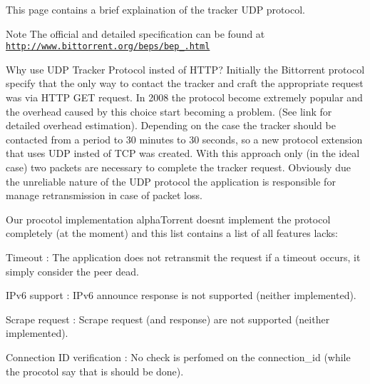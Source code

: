 This page contains a brief explaination of the tracker U\+DP protocol.

\begin{DoxyNote}{Note}
The official and detailed specification can be found at \href{http://www.bittorrent.org/beps/bep_0015.html}{\tt http\+://www.\+bittorrent.\+org/beps/bep\+\_.\+html}
\end{DoxyNote}
\begin{DoxyParagraph}{Why use U\+DP Tracker Protocol insted of H\+T\+TP?}
Initially the Bittorrent protocol specify that the only way to contact the tracker and craft the appropriate request was via H\+T\+TP G\+ET request. In 2008 the protocol become extremely popular and the overhead caused by this choice start becoming a problem. (See link for detailed overhead estimation). Depending on the case the tracker should be contacted from a period to 30 minutes to 30 seconds, so a new protocol extension that uses U\+DP insted of T\+CP was created. With this approach only (in the ideal case) two packets are necessary to complete the tracker request. Obviously due the unreliable nature of the U\+DP protocol the application is responsible for manage retransmission in case of packet loss.
\end{DoxyParagraph}
\begin{DoxyParagraph}{Our procotol implementation}
alpha\+Torrent doesn\textquotesingle{}t implement the protocol completely (at the moment) and this list contains a list of all features lacks\+:
\begin{DoxyEnumerate}
\item Timeout \+: The application does not retransmit the request if a timeout occurs, it simply consider the peer dead.
\item I\+Pv6 support \+: I\+Pv6 announce response is not supported (neither implemented).
\item Scrape request \+: Scrape request (and response) are not supported (neither implemented).
\item Connection ID verification \+: No check is perfomed on the connection\+\_\+id (while the procotol say that is should be done). 
\end{DoxyEnumerate}
\end{DoxyParagraph}
